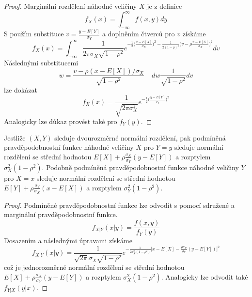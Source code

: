 \begin{proof}
Marginální rozdělení náhodné veličiny $X$ je z definice
\begin{equation*}
f_X(x) = \int_{-\infty}^{\infty} f(x,y)dy
\end{equation*}
S použím substituce $v = \frac{y - E[Y]}{\sigma_Y}$ a doplněním čtverců pro $v$ získáme
\begin{equation*}
f_X(x) = \int_{-\infty}^{\infty} \frac{1}{2 \pi \sigma_X \sqrt{1 - \rho^2}} e^{-\frac{1}{2} \big(\frac{x - E[X]}{\sigma_X} \big)^2 - \frac{1}{2(1 - \rho)^2} \big(v - \rho \frac{x - E[X]}{\sigma_X} \big)^2}dv
\end{equation*}
Následnými substitucemi
\begin{equation*}
w = \frac{v - \rho(x - E[X])/ \sigma_X}{\sqrt{1 - \rho^2}} ~~~~~ dw \frac{1}{\sqrt{1 - \rho^2}}dv
\end{equation*}
lze dokázat
\begin{equation*}
f_X(x) = \frac{1}{\sqrt{2 \pi \sigma_X^2}} e^{-\frac{1}{2}\big(\frac{y - E[Y]}{\sigma_Y} \big)^2}
\end{equation*}
Analogicky lze důkaz provést také pro $f_Y(y)$.
\end{proof}
\begin{theorem}
Jestliže $(X,Y)$ sleduje dvourozměrné normální rozdělení, pak podmíněná pravděpodobnostní funkce náhodné veličiny $X$ pro $Y = y$ sleduje normální rozdělení se střední hodnotou $E[X] + \rho \frac{\sigma_X}{\sigma_Y}(y - E[Y])$ a rozptylem $\sigma_X^2(1 - \rho^2)$. Podobně podmíněná pravděpodobnostní funkce náhodné veličiny $Y$ pro $X = x$ sleduje normální rozdělení se střední hodnotou $E[Y] + \rho \frac{\sigma_Y}{\sigma_X}(x - E[X])$ a rozptylem $\sigma_Y^2(1 - \rho^2)$.
\end{theorem}

\begin{proof}
Podmíněné pravděpodobnostní funkce lze odvodit s pomocí sdružené a marginální pravděpodobnostní funkce.
\begin{equation*}
f_{X|Y}(x|y) = \frac{f(x,y)}{f_Y(y)}
\end{equation*}
Dosazením a následnými úpravami získáme
\begin{equation*}
f_{X|Y}(x|y) = \frac{1}{\sqrt{2 \pi} \sigma_X \sqrt{1 - \rho^2}}e^{-\frac{1}{2 \sigma_X^2(1 - \rho^2)}\big[x - E[X] - \frac{\rho \sigma_X}{\sigma_Y}(y - E[Y]) \big]^2}
\end{equation*}
což je jednorozměrné normální rozdělení se střední hodnotou $E[X] + \rho \frac{\sigma_X}{\sigma_Y}(y - E[Y])$ a rozptylem $\sigma_X^2(1 - \rho^2)$. Analogicky lze odvodit také $f_{Y|X}(y|x)$.
\end{proof}

